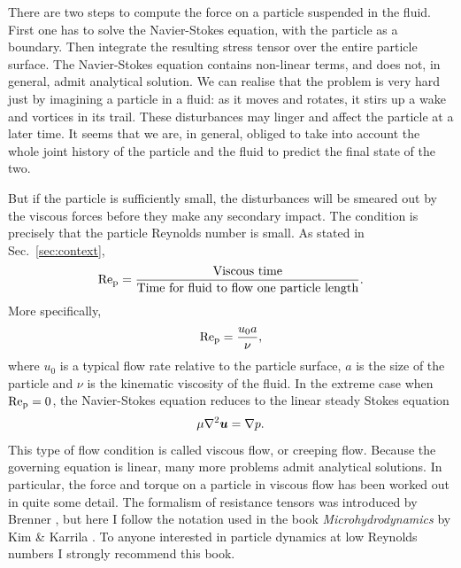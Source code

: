 \documentclass[thesis.tex]{subfiles}
\begin{document}
There are two steps to compute the force on a particle suspended in the fluid. First one has to solve the Navier-Stokes equation, with the particle as a boundary. Then integrate the resulting stress tensor over the entire particle surface. The Navier-Stokes equation  contains non-linear terms, and does not, in general, admit analytical solution. We can realise that the problem is very hard just by imagining a particle in a fluid: as it moves and rotates, it stirs up a wake and vortices in its trail. These disturbances may linger and affect the particle at a later time. It seems that we are, in general, obliged to take into account the whole joint history of the particle and the fluid to predict the final state of the two.

But if the particle is sufficiently small, the disturbances will be smeared out by the viscous forces before they make any secondary impact. The condition is precisely that the particle Reynolds number is small. As stated in Sec.~\ref{sec:context},
\begin{align*}
 	\mbox{Re}_{\mathrm p} = \frac{\textrm{Viscous time}}{\textrm{Time for fluid to flow one particle length}}.
\end{align*}
More specifically,
\begin{align*}
	\mbox{Re}_{\mathrm p} = \frac{u_0 a}{\nu},
\end{align*}
where $u_0$ is a typical flow rate relative to the particle surface, $a$ is the size of the particle and $\nu$ is the kinematic viscosity of the fluid. In the extreme case when $\mbox{Re}_{\mathrm p}=0$, the Navier-Stokes equation  reduces to the linear steady Stokes equation
\begin{align*}
	\mu \nabla^2 \mbox{\boldmath$u$} = \nabla p.
\end{align*}
This type of flow condition is called viscous flow, or creeping flow. Because the governing equation is linear, many more problems admit analytical solutions. In particular, the force and torque on a particle in viscous flow has been worked out in quite some detail. The formalism of resistance tensors was introduced by Brenner \cite{brenner1974, happel1965}, but here I follow the notation used in the book \emph{Microhydrodynamics} by Kim \& Karrila \cite{kim1991}. To anyone interested in particle dynamics at low Reynolds numbers I strongly recommend this book.
\end{document}
